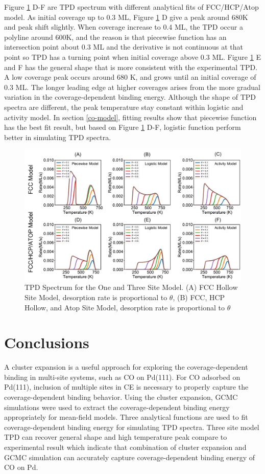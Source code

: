 \documentclass[11pt]{article}
\begin{document}
Figure \ref{tpd} D-F are TPD spectrum with different analytical fits of FCC/HCP/Atop model. As initial coverage up to 0.3 ML, Figure \ref{tpd} D give a peak around 680K and peak shift slightly. When coverage increase to 0.4 ML, the TPD occur a polyline around 600K, and the reason is that piecewise function has an intersection point about 0.3 ML and the derivative is not continuous at that point so TPD has a turning point when initial coverage above 0.3 ML. Figure \ref{tpd} E and F has the general shape that is more consistent with the experimental TPD. A low coverage peak occurs around 680 K, and grows until an initial coverage of 0.3 ML. The longer leading edge at higher coverages arises from the more gradual variation in the coverage-dependent binding energy. Although the shape of TPD spectra are different, the peak temperature stay constant within logistic and activity model. 
 In section \ref{co-model}, fitting results show that piecewise function has the best fit result, but based on Figure \ref{tpd} D-F, logistic function perform better in simulating TPD spectra.


\begin{figure}[t]
	\centering
	\includegraphics[width=\textwidth]{Figure/tpd13.pdf}
	\caption{TPD Spectrum for the One and Three Site Model. (A) FCC Hollow Site Model, desorption rate is proportional to $\theta$, (B) FCC, HCP Hollow, and Atop Site Model, desorption rate is proportional to $\theta$}
	\label{tpd}
\end{figure}

\clearpage
\section{Conclusions}
A cluster expansion is a useful approach for exploring the coverage-dependent binding in multi-site systems, such as CO on Pd(111). For CO adsorbed on Pd(111), inclusion of multiple sites in CE is necessary to properly capture the coverage-dependent binding behavior. Using the cluster expansion, GCMC simulations were used to extract the coverage-dependent binding energy appropriately for mean-field models. Three analytical functions are used to fit coverage-dependent binding energy for simulating TPD spectra. Three site model TPD can recover general shape and high temperature peak compare to experimental result which indicate that combination of cluster expansion and GCMC simulation can accurately capture coverage-dependent binding energy of CO on Pd. \\
\end{document}
